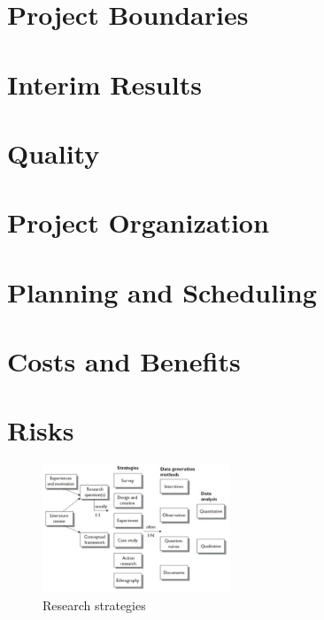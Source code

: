 \documentclass[11pt, a4paper]{article}
\begin{document}
\section{Project Boundaries}

\section{Interim Results}

\section{Quality}

\section{Project Organization}

\section{Planning and Scheduling}

\section{Costs and Benefits}

\section{Risks}

\begin{figure}[h]
    \center
    \includegraphics[width=0.5\textwidth]{research-strategies.png}
    \caption{Research strategies \cite{oates2005researching}}
    \label{fig:research_strategies}
\end{figure}

\printbibliography 
\pagebreak

\end{document}
